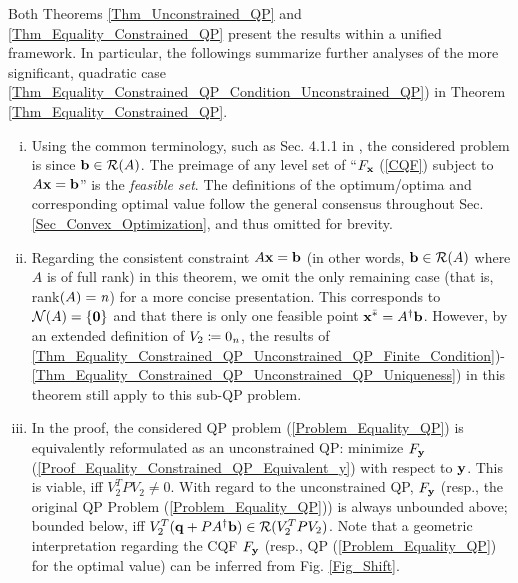 \documentclass{imaman}
\newcommand{\bfb}{{\bf b}}
\newcommand{\bfx}{{\bf x}}
\newcommand{\bfq}{{\bf q}}
\newcommand{\bfy}{{\bf y}}
\newcommand{\bfzero}{{\bf 0}}
\newcommand{\calN}{{\mathcal N}}
\newcommand{\calR}{{\mathcal R}}
\newcommand{\itn}{{\it n}}
\numberwithin{equation}{section}
\begin{document}
\begin{remark}
Both Theorems \ref{Thm_Unconstrained_QP} and \ref{Thm_Equality_Constrained_QP} present the results within a unified framework. In particular, the followings summarize further analyses of the more significant, quadratic case \ref{Thm_Equality_Constrained_QP_Condition_Unconstrained_QP}) in Theorem \ref{Thm_Equality_Constrained_QP}.
\begin{enumerate}[i)]
\item Using the common terminology, such as Sec. 4.1.1 in \cite{BoVa:04}, the considered problem is  since $\bfb\in\calR(A)$. The preimage of any level set of ``$F_\bfx$ (\ref{CQF}) subject to $A\bfx=\bfb$'' is the \textit{feasible set}. The definitions of the optimum/optima and corresponding optimal value follow the general consensus \citep{BoVa:04} throughout Sec. \ref{Sec_Convex_Optimization}, and thus omitted for brevity.
\item\label{Rem_Thm_Equality_Constrained_QP_Vertex} Regarding the consistent constraint $A\bfx=\bfb$ (in other words, $\bfb\in\calR(A)$ where $A$ is of full rank) in this theorem, we omit the only remaining case (that is, rank$(A)=\itn$) for a more concise presentation. This corresponds to $\calN(A)=\{\bfzero\}$ and that there is only one feasible point $\bfx^{\bar *}=A^\dagger\bfb$. However, by an extended definition of $V_2\coloneqq 0_\itn$, the results of \ref{Thm_Equality_Constrained_QP_Unconstrained_QP_Finite_Condition})-\ref{Thm_Equality_Constrained_QP_Unconstrained_QP_Uniqueness}) in this theorem still apply to this sub-QP problem.
\item\label{Rem_Thm_Equality_Constrained_QP_Boundedness} In the proof, the considered QP problem (\ref{Problem_Equality_QP}) is equivalently reformulated as an unconstrained QP: minimize $F_\bfy$ (\ref{Proof_Equality_Constrained_QP_Equivalent_y}) with respect to $\bfy$. This is viable, iff $V_2^TPV_2\ne 0$. With regard to the unconstrained QP, $F_\bfy$ (resp., the original QP Problem (\ref{Problem_Equality_QP})) is always unbounded above; bounded below, iff $V_2^T(\bfq+PA^\dagger\bfb)\in\calR(V_2^TPV_2)$. Note that a geometric interpretation regarding the CQF $F_\bfy$ (resp., QP (\ref{Problem_Equality_QP}) for the optimal value) can be inferred from Fig. \ref{Fig_Shift}.
\end{enumerate}
\label{Rem_Thm_Equality_Constrained_QP}
\end{remark}
\end{document}
